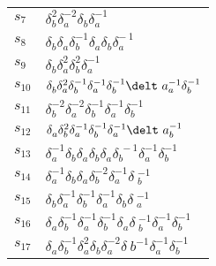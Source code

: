 \documentclass{article}
\begin{document}
\begin{center}
\begin{tabular}{ll}
$s_{7}$ & $\delta_b^{2}\delta_a^{-2}\delta_b^{}\delta_a^{-1}$ \\
$s_{8}$ & $\delta_b^{}\delta_a^{}\delta_b^{-1}\delta_a^{}\delta_b^{}\delta_a^{-\
1}$ \\
$s_{9}$ & $\delta_b^{}\delta_a^{2}\delta_b^{2}\delta_a^{-1}$ \\
$s_{10}$ & $\delta_b^{}\delta_a^{2}\delta_b^{-1}\delta_a^{-1}\delta_b^{-1}\delt\
a_a^{-1}\delta_b^{-1}$ \\
$s_{11}$ & $\delta_b^{-2}\delta_a^{-2}\delta_b^{-1}\delta_a^{-1}\delta_b^{-1}$ 
\\
$s_{12}$ & $\delta_a^{}\delta_b^{2}\delta_a^{-1}\delta_b^{-1}\delta_a^{-1}\delt\
a_b^{-1}$ \\
$s_{13}$ & $\delta_a^{-1}\delta_b^{}\delta_a^{}\delta_b^{}\delta_a^{}\delta_b^{\
-1}\delta_a^{-1}\delta_b^{-1}$ \\
$s_{14}$ & $\delta_a^{-1}\delta_b^{}\delta_a^{}\delta_b^{-2}\delta_a^{-1}\delta\
_b^{-1}$ \\
$s_{15}$ & $\delta_b^{}\delta_a^{-1}\delta_b^{-1}\delta_a^{-1}\delta_b^{}\delta\
_a^{-1}$ \\
$s_{16}$ & $\delta_a^{}\delta_b^{-1}\delta_a^{-1}\delta_b^{-1}\delta_a^{}\delta\
_b^{-1}\delta_a^{-1}\delta_b^{-1}$ \\
$s_{17}$ & $\delta_a^{}\delta_b^{-1}\delta_a^{2}\delta_b^{}\delta_a^{-2}\delta_\
b^{-1}\delta_a^{-1}\delta_b^{-1}$ \\
\bottomrule
\end{tabular}
\end{center}

\thispagestyle{empty}
\end{document}
